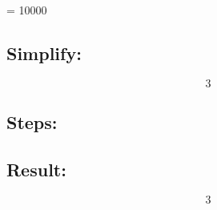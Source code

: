 \documentclass{article}
\author{}
\begin{document}
\maketitle
\relpenalty   = 10000\subsection*{Simplify:}
\begin{dmath*}3\end{dmath*}\subsection*{Steps:}
\subsection*{Result:}
\begin{dmath*}3\end{dmath*}
\end{document}
